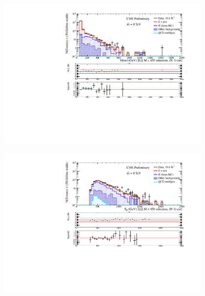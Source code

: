 \documentclass[bigger]{beamer}
\begin{document}
\begin{frame}
\begin{columns}
\begin{column}{0.55\textwidth}
\centering
\includegraphics[width=0.8\textwidth]{fig/ee/nMinus1/Mee_StAndMejLQ450_eejj.pdf}
\label{sec-1-12-1-1-2-2}


\centering
\includegraphics[width=0.8\textwidth]{fig/ee/nMinus1/sT_eejj_MeeAndMejLQ450_eejj.pdf}
\end{column}
\end{columns}
\end{frame}
\end{document}
